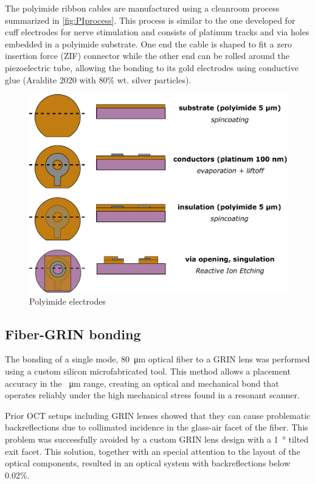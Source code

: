 \documentclass[10pt]{iopart}
\begin{document}
The polyimide ribbon cables are manufactured using a cleanroom process summarized in \autoref{fig:PIprocess}. This process is similar to the one developed for cuff electrodes for nerve stimulation \cite{Rodriguez2000} and consists of platinum tracks and via holes embedded in a polyimide substrate. One end the cable is shaped to fit a zero insertion force (ZIF) connector while the other end can be rolled around the piezoelectric tube, allowing the bonding to its gold electrodes using conductive glue (Araldite 2020 with 80\% wt. silver particles).

\begin{figure}[h!]\centering \includegraphics[width=\columnwidth]{figures/PIprocess.pdf}
      \caption{Polyimide electrodes}
      \label{fig:PIprocess}
\end{figure}


\subsection{Fiber-GRIN bonding}
The bonding of a single mode, \SI{80}{\micro\meter} optical fiber to a GRIN lens was performed using a custom silicon microfabricated tool. This method allows a placement accuracy in the \SI{}{\micro\meter} range, creating an optical and mechanical bond that operates reliably under the high mechanical stress found in a resonant scanner. 

Prior OCT setups including GRIN lenses showed that they can cause problematic backreflections due to collimated incidence in the glass-air facet of the fiber. This problem was successfully avoided by a custom GRIN lens design with a \SI{1}{\degree} tilted exit facet. This solution, together with an special attention to the layout of the optical components, resulted in an optical system with backreflections below 0.02\%.
\end{document}
